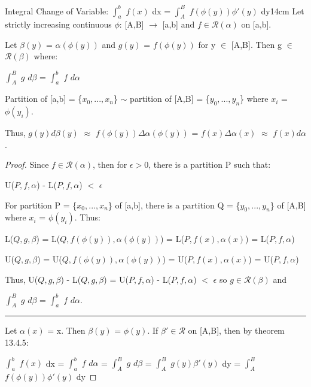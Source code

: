     \newpage



    \begin{wtheorem}{Integral Change of Variable:
    $\int_a^b$ $f(x)$ dx = $\int_A^B$ $f(\phi(y)) \phi'(y)$ dy}{14cm}
        Let strictly increasing continuous $\phi$:
        [A,B] $\rightarrow$ [a,b] and $f \in \mathscr{R}(\alpha)$ on [a,b].

        Let $\beta(y)$ = $\alpha(\phi(y))$ and
        $g(y)$ = $f(\phi(y))$ for y $\in$ [A,B].
        Then g $\in$ $\mathscr{R}(\beta)$ where:

        \hspace{0.5cm}
        $\int_A^B$ $g$ $d\beta$ = $\int_a^b$ $f$ $d\alpha$
    \end{wtheorem}

    \begin{intuition}
        Partition of [a,b] = \{$x_0,...,x_n$\}
        $\sim$
        partition of [A,B] = \{$y_0,...,y_n$\} where $x_i$ = $\phi(y_i)$.

        Thus,
        $g(y) d\beta(y)$
        $\approx$ $f(\phi(y)) \Delta \alpha(\phi(y))$
        = $f(x) \Delta \alpha(x)$
        $\approx$ $f(x) d\alpha$.
    \end{intuition}

    \vspace{0.1cm}

    \begin{proof}
        Since $f \in \mathscr{R}(\alpha)$, then for $\epsilon > 0$, there
        is a partition P such that:

        \hspace{0.5cm}
        U($P,f,\alpha$) - L($P,f,\alpha$) $<$ $\epsilon$

        For partition P = \{$x_0,...,x_n$\} of [a,b], there is a partition Q
        = \{$y_0,...,y_n$\} of [A,B] where $x_i$ = $\phi(y_i)$. Thus:

        \hspace{0.5cm}
        L($Q,g,\beta$)
        = L($Q,f(\phi(y)),\alpha(\phi(y))$)
        = L($P,f(x),\alpha(x)$)
        = L($P,f,\alpha$)

        \hspace{0.5cm}
        U($Q,g,\beta$)
        = U($Q,f(\phi(y)),\alpha(\phi(y))$)
        = U($P,f(x),\alpha(x)$)
        = U($P,f,\alpha$)

        Thus, U($Q,g,\beta$) - L($Q,g,\beta$)
        = U($P,f,\alpha$) - L($P,f,\alpha$) $<$ $\epsilon$
        so $g \in \mathscr{R}(\beta)$ and

        $\int_A^B$ $g$ $d\beta$ = $\int_a^b$ $f$ $d\alpha$.

        \rule[0.1cm]{15cm}{0.01cm}

        Let $\alpha(x)$ = x. Then $\beta(y)$ = $\phi(y)$.
        If $\beta' \in \mathscr{R}$ on [A,B], then by {\color{red} theorem 13.4.5}:

        \hspace{0.5cm}
        $\int_a^b$ $f(x)$ dx
        = $\int_a^b$ $f$ $d\alpha$
        = $\int_A^B$ $g$ $d\beta$
        = $\int_A^B$ $g(y) \beta'(y)$ dy
        = $\int_A^B$ $f(\phi(y)) \phi'(y)$ dy    
    \end{proof}

